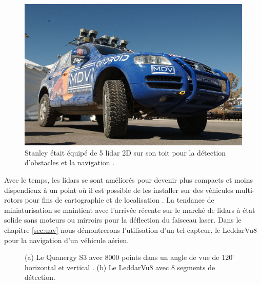 \begin{figure}[ht]
  \centering
  \includegraphics[width=0.5\linewidth]{images/stanley.jpg}
  \caption[Stanley la voiture autonome fonctionnant par lidar.]{Stanley était équipé de 5 lidar 2D sur son toit pour la détection d'obstacles et la navigation \citep{thrun2006stanley}.}
  \label{fig:stanley}
\end{figure}

Avec le temps, les lidars se sont améliorés pour devenir plus compacts et moins dispendieux à un point où il est possible de les installer sur des véhicules multi-rotors pour fins de cartographie et de localisation \citep{zhang2018aerial}. La tendance de miniaturisation se maintient avec l'arrivée récente sur le marché de lidars à état solide sans moteurs ou mirroirs pour la déflection du faisceau laser. Dans le chapitre \ref{sec:uav} nous démontrerons l'utilisation d'un tel capteur, le LeddarVu8 pour la navigation d'un véhicule aérien.

\begin{figure}[!h]
  \centering
  \caption[Lidars à état solide]{
    (a) Le Quanergy S3 avec $8000$ points dans un angle de vue de $120^\circ$ horizontal et vertical \citep{eldada2016}.
    (b) Le LeddarVu8 avec $8$ segments de détection.
  }
  \label{fig:lidars}
\end{figure}

